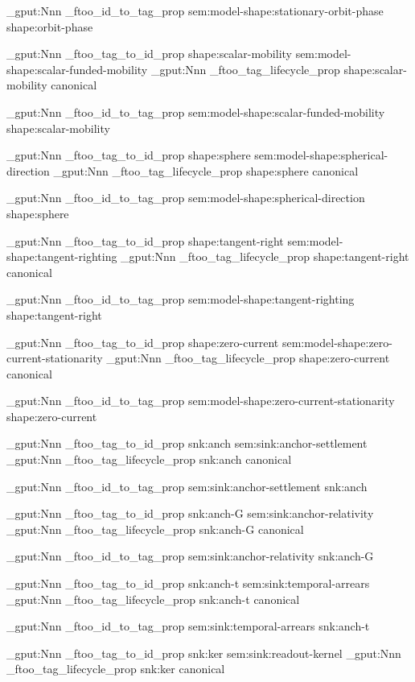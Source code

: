 \prop_gput:Nnn \g_ftoo_id_to_tag_prop { sem:model-shape:stationary-orbit-phase } { shape:orbit-phase }


\prop_gput:Nnn \g_ftoo_tag_to_id_prop { shape:scalar-mobility } { sem:model-shape:scalar-funded-mobility }
\prop_gput:Nnn \g_ftoo_tag_lifecycle_prop { shape:scalar-mobility } { canonical }

\prop_gput:Nnn \g_ftoo_id_to_tag_prop { sem:model-shape:scalar-funded-mobility } { shape:scalar-mobility }


\prop_gput:Nnn \g_ftoo_tag_to_id_prop { shape:sphere } { sem:model-shape:spherical-direction }
\prop_gput:Nnn \g_ftoo_tag_lifecycle_prop { shape:sphere } { canonical }

\prop_gput:Nnn \g_ftoo_id_to_tag_prop { sem:model-shape:spherical-direction } { shape:sphere }


\prop_gput:Nnn \g_ftoo_tag_to_id_prop { shape:tangent-right } { sem:model-shape:tangent-righting }
\prop_gput:Nnn \g_ftoo_tag_lifecycle_prop { shape:tangent-right } { canonical }

\prop_gput:Nnn \g_ftoo_id_to_tag_prop { sem:model-shape:tangent-righting } { shape:tangent-right }


\prop_gput:Nnn \g_ftoo_tag_to_id_prop { shape:zero-current } { sem:model-shape:zero-current-stationarity }
\prop_gput:Nnn \g_ftoo_tag_lifecycle_prop { shape:zero-current } { canonical }

\prop_gput:Nnn \g_ftoo_id_to_tag_prop { sem:model-shape:zero-current-stationarity } { shape:zero-current }


\prop_gput:Nnn \g_ftoo_tag_to_id_prop { snk:anch } { sem:sink:anchor-settlement }
\prop_gput:Nnn \g_ftoo_tag_lifecycle_prop { snk:anch } { canonical }

\prop_gput:Nnn \g_ftoo_id_to_tag_prop { sem:sink:anchor-settlement } { snk:anch }


\prop_gput:Nnn \g_ftoo_tag_to_id_prop { snk:anch-G } { sem:sink:anchor-relativity }
\prop_gput:Nnn \g_ftoo_tag_lifecycle_prop { snk:anch-G } { canonical }

\prop_gput:Nnn \g_ftoo_id_to_tag_prop { sem:sink:anchor-relativity } { snk:anch-G }


\prop_gput:Nnn \g_ftoo_tag_to_id_prop { snk:anch-t } { sem:sink:temporal-arrears }
\prop_gput:Nnn \g_ftoo_tag_lifecycle_prop { snk:anch-t } { canonical }

\prop_gput:Nnn \g_ftoo_id_to_tag_prop { sem:sink:temporal-arrears } { snk:anch-t }


\prop_gput:Nnn \g_ftoo_tag_to_id_prop { snk:ker } { sem:sink:readout-kernel }
\prop_gput:Nnn \g_ftoo_tag_lifecycle_prop { snk:ker } { canonical }

